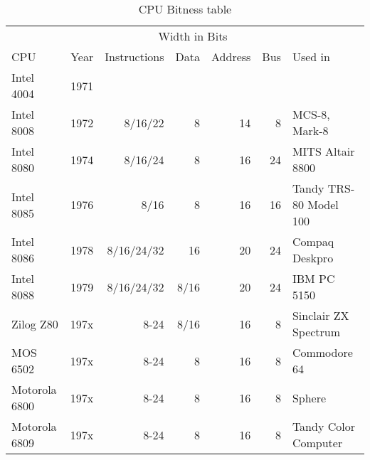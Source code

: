 \documentclass[twoside,twocolumn]{article}
\begin{document}
\begin{table*}[h]
\centering %
\begin{tabular}{lrrrrrl}
\toprule
&&\multicolumn{4}{c}{Width in Bits} \\
\cmidrule(r){3-6}
CPU & Year & Instructions & Data & Address & Bus & Used in \\
\toprule
Intel 4004 & 1971 \cite{intelquick} &  &  &  &  &  \\
\hline
Intel 8008\footnotemark[1] \cite{intel8008} & 1972 \cite{intelquick} & 8/16/22 & 8 & 14 & 8 & MCS-8, Mark-8 \\
\hline
Intel 8080\footnotemark[2] \cite{intel8080} & 1974 \cite{intelquick} & 8/16/24 & 8 & 16 & 24 & MITS Altair 8800 \\
\hline
Intel 8085 & 1976 \cite{intelquick} & 8/16 & 8 & 16 & 16 & Tandy TRS-80 Model 100 \\
\hline
Intel 8086\footnotemark[3] & 1978 \cite{intelquick} & 8/16/24/32 & 16 & 20 & 24 & Compaq Deskpro \\
\hline
Intel 8088\footnotemark[4] \footnotemark[5] \cite{intel8088} & 1979 \cite{intelquick} & 8/16/24/32 & 8/16 & 20 & 24 & IBM PC 5150 \\
\hline
Zilog Z80\footnotemark[6] & 197x & 8-24 & 8/16 & 16 & 8 & Sinclair ZX Spectrum \\
\hline
MOS 6502\footnotemark[7] & 197x & 8-24 & 8 & 16 & 8 & Commodore 64 \\
\hline
Motorola 6800 & 197x & 8-24 & 8 & 16 & 8 & Sphere \\
\hline
Motorola 6809 & 197x & 8-24 & 8 & 16 & 8 & Tandy Color Computer \\
\bottomrule
\end{tabular}
\caption{CPU Bitness table} %
\label{tab:bitness}
\end{table*}

\end{document}
